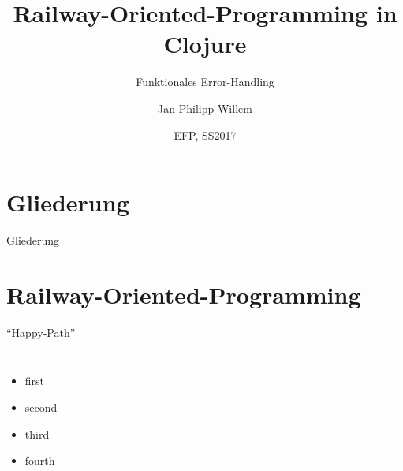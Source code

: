 \documentclass[compress]{beamer}
\title{Railway-Oriented-Programming \break in Clojure}
\subtitle{Funktionales Error-Handling}
\author{Jan-Philipp Willem}
\institute{Fakultät für Informatik\\Hochschule Mannheim}
\date{EFP, SS2017}
\begin{document}

\maketitle

\section*{Gliederung}
\begin{frame}{Gliederung}
  \tableofcontents[hideallsubsections]
\end{frame}

\section{Railway-Oriented-Programming}
  \begin{frame}{"`Happy-Path"'}
  \setcounter{framenumber}{1}
    \begin{columns}[c]
      \begin{itemize}
        \item first
        \item<2-> second
        \item<3-> third
        \item<4-> fourth
      \end{itemize}
    \end{columns}
  \end{frame}

  \note[itemize]{
      \item 
  }
\end{document}
